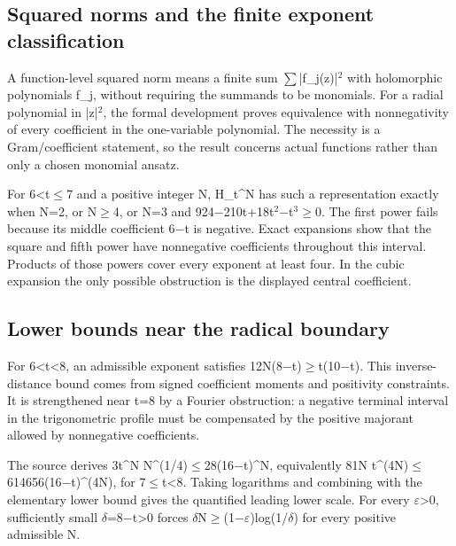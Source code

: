 \documentclass[11pt,a4paper]{article}
\begin{document}
\subsection{Squared norms and the finite exponent classification}
A function-level squared norm means a finite sum \ensuremath{\sum}|f\_j(z)|\ensuremath{^2} with holomorphic polynomials f\_j, without requiring the summands to be monomials. For a radial polynomial in |z|\ensuremath{^2}, the formal development proves equivalence with nonnegativity of every coefficient in the one-variable polynomial. The necessity is a Gram/coefficient statement, so the result concerns actual functions rather than only a chosen monomial ansatz.

For 6<t\ensuremath{\leq}7 and a positive integer N, H\_t\textasciicircum{}N has such a representation exactly when N=2, or N\ensuremath{\geq}4, or N=3 and 924\ensuremath{-}210t+18t\ensuremath{^2}\ensuremath{-}t\ensuremath{^3}\ensuremath{\geq}0. The first power fails because its middle coefficient 6\ensuremath{-}t is negative. Exact expansions show that the square and fifth power have nonnegative coefficients throughout this interval. Products of those powers cover every exponent at least four. In the cubic expansion the only possible obstruction is the displayed central coefficient.

\subsection{Lower bounds near the radical boundary}
For 6<t<8, an admissible exponent satisfies 12N(8\ensuremath{-}t)\ensuremath{\geq}t(10\ensuremath{-}t). This inverse-distance bound comes from signed coefficient moments and positivity constraints. It is strengthened near t=8 by a Fourier obstruction: a negative terminal interval in the trigonometric profile must be compensated by the positive majorant allowed by nonnegative coefficients.

The source derives 3t\textasciicircum{}N N\textasciicircum{}(1/4)\ensuremath{\leq}28(16\ensuremath{-}t)\textasciicircum{}N, equivalently 81N t\textasciicircum{}(4N)\ensuremath{\leq}614656(16\ensuremath{-}t)\textasciicircum{}(4N), for 7\ensuremath{\leq}t<8. Taking logarithms and combining with the elementary lower bound gives the quantified leading lower scale. For every \ensuremath{\varepsilon}>0, sufficiently small \ensuremath{\delta}=8\ensuremath{-}t>0 forces \ensuremath{\delta}N\ensuremath{\geq}(1\ensuremath{-}\ensuremath{\varepsilon})log(1/\ensuremath{\delta}) for every positive admissible N.
\end{document}
